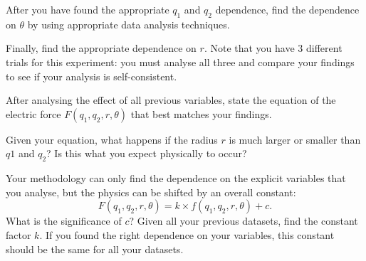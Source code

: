 \documentclass[12pt]{article}
\begin{document}
After you have found the appropriate $q_1$ and $q_2$ dependence, find the dependence on $\theta$ by using appropriate data analysis techniques.

Finally, find the appropriate dependence on $r$. Note that you have 3 different trials for this experiment: you must analyse all three and compare your findings to see if your analysis is self-consistent.

After analysing the effect of all previous variables, state the equation of the electric force $F(q_1,q_2,r,\theta)$ that best matches your findings. 

Given your equation, what happens if the radius $r$ is much larger or smaller than $q1$ and $q_2$? Is this what you expect physically to occur?

Your methodology can only find the dependence on the explicit variables that you analyse, but the physics can be shifted by an overall constant:
\begin{equation}
F(q_1, q_2, r, \theta) = k \times  f(q_1,q_2,r,\theta) +c.
\end{equation}
What is the significance of $c$? Given all your previous datasets, find the constant factor $k$. If you found the right dependence on your variables, this constant should be the same for all your datasets.
\end{document}
